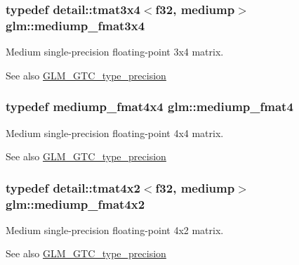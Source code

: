 \subsubsection[{\texorpdfstring{mediump\+\_\+fmat3x4}{mediump_fmat3x4}}]{\setlength{\rightskip}{0pt plus 5cm}typedef detail\+::tmat3x4$<$f32, mediump$>$ {\bf glm\+::mediump\+\_\+fmat3x4}}\hypertarget{group__gtc__type__precision_gafa5aaa948365f349840dfeb9eeebf0cd}{}\label{group__gtc__type__precision_gafa5aaa948365f349840dfeb9eeebf0cd}
Medium single-\/precision floating-\/point 3x4 matrix. \begin{DoxySeeAlso}{See also}
\hyperlink{group__gtc__type__precision}{G\+L\+M\+\_\+\+G\+T\+C\+\_\+type\+\_\+precision} 
\end{DoxySeeAlso}
\subsubsection[{\texorpdfstring{mediump\+\_\+fmat4}{mediump_fmat4}}]{\setlength{\rightskip}{0pt plus 5cm}typedef mediump\+\_\+fmat4x4 {\bf glm\+::mediump\+\_\+fmat4}}\hypertarget{group__gtc__type__precision_ga6cd3ae1f3509b79061edcc83564769d4}{}\label{group__gtc__type__precision_ga6cd3ae1f3509b79061edcc83564769d4}
Medium single-\/precision floating-\/point 4x4 matrix. \begin{DoxySeeAlso}{See also}
\hyperlink{group__gtc__type__precision}{G\+L\+M\+\_\+\+G\+T\+C\+\_\+type\+\_\+precision} 
\end{DoxySeeAlso}
\subsubsection[{\texorpdfstring{mediump\+\_\+fmat4x2}{mediump_fmat4x2}}]{\setlength{\rightskip}{0pt plus 5cm}typedef detail\+::tmat4x2$<$f32, mediump$>$ {\bf glm\+::mediump\+\_\+fmat4x2}}\hypertarget{group__gtc__type__precision_ga09a2851d38fe3cf52735a1d26199bdcc}{}\label{group__gtc__type__precision_ga09a2851d38fe3cf52735a1d26199bdcc}
Medium single-\/precision floating-\/point 4x2 matrix. \begin{DoxySeeAlso}{See also}
\hyperlink{group__gtc__type__precision}{G\+L\+M\+\_\+\+G\+T\+C\+\_\+type\+\_\+precision} 
\end{DoxySeeAlso}
